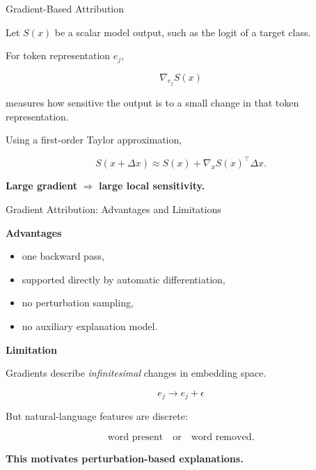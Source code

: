 \documentclass[11pt,compress,t,notes=noshow, xcolor=table]{beamer}
\begin{document}

\begin{vbframe}{Gradient-Based Attribution}

Let \(S(x)\) be a scalar model output, such as
the logit of a target class.

For token representation \(e_j\),

\[
\nabla_{e_j} S(x)
\]

measures how sensitive the output is to a small change
in that token representation.

Using a first-order Taylor approximation,

\[
S(x+\Delta x)
\approx
S(x)
+
\nabla_x S(x)^\top \Delta x.
\]

\begin{center}
\textbf{Large gradient}
\(\Rightarrow\)
\textbf{large local sensitivity.}
\end{center}

\end{vbframe}



\begin{vbframe}{Gradient Attribution: Advantages and Limitations}

\textbf{Advantages}

\begin{itemize}
    \item one backward pass,
    \item supported directly by automatic differentiation,
    \item no perturbation sampling,
    \item no auxiliary explanation model.
\end{itemize}

\medskip

\textbf{Limitation}

Gradients describe \emph{infinitesimal} changes in embedding space.

\[
e_j
\longrightarrow
e_j+\epsilon
\]

But natural-language features are discrete:

\[
\text{word present}
\quad\text{or}\quad
\text{word removed}.
\]

\begin{center}
\textbf{This motivates perturbation-based explanations.}
\end{center}

\end{vbframe}
\end{document}
